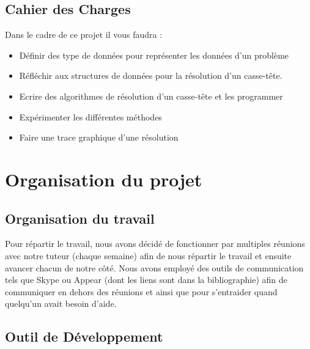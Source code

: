 \documentclass{article}
\begin{document}
   \subsection{\Large Cahier des Charges}
   Dans le cadre de ce projet il vous faudra :
   \begin{itemize}
       \item Définir des type de données pour représenter les données d'un problème
       \item Réfléchir aux structures de données pour la résolution d'un casse-tête.
       \item Ecrire des algorithmes de résolution d'un casse-tête et les programmer
       \item Expérimenter les différentes méthodes
       \item Faire une trace graphique d'une résolution
   \end{itemize}
   
\section{\LARGE Organisation du projet}

    \subsection{\Large Organisation du travail}
    
    \hspace{0.5cm} Pour répartir le travail, nous avons décidé de fonctionner par multiples réunions avec notre tuteur (chaque semaine) afin de nous répartir le travail et ensuite avancer chacun de notre côté. Nous avons employé des outils de communication tels que Skype ou Appear (dont les liens sont dans la bibliographie) afin de communiquer en dehors des réunions et ainsi que pour s'entraider quand quelqu'un avait besoin d'aide.\newline \newline
    
    
 
    
    \subsection{Outil de Développement}
    
\end{document}
